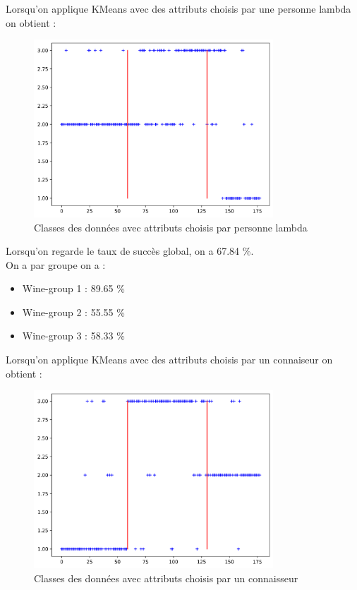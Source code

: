 \documentclass[a4paper,12pt]{article}
\begin{document}
Lorsqu'on applique KMeans avec des attributs choisis par une personne lambda on obtient :

\begin{figure}[h!] %
   \centering
   \includegraphics[width=0.8\textwidth]{normal_atributes.png} %
   \caption{Classes des données avec attributs choisis par personne lambda}
\end{figure}
\newpage

Lorsqu'on regarde le taux de succès global, on a 67.84 \%.\\

On a par groupe on a :
\begin{itemize}
\item Wine-group 1 : 89.65 \%
\item Wine-group 2 : 55.55 \%
\item Wine-group 3 : 58.33 \%
\end{itemize}

\vspace{10pt}

Lorsqu'on applique KMeans avec des attributs choisis par un connaiseur on obtient :

\begin{figure}[h!] %
   \centering
   \includegraphics[width=0.8\textwidth]{profetional_atributes.png} %
   \caption{Classes des données avec attributs choisis par un connaisseur}
\end{figure}
\end{document}
